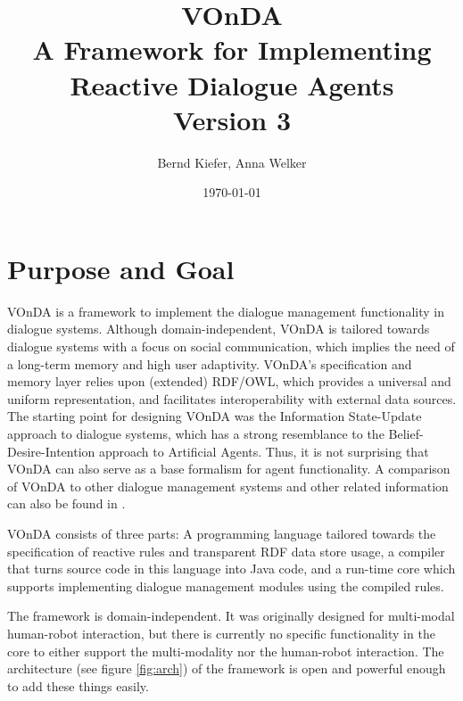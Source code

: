 \documentclass[a4paper]{report}
\newcommand{\vonda}{VOnDA\xspace}
\begin{document}
\title{\vonda\\\Large A Framework for Implementing Reactive Dialogue
  Agents\\Version 3}

\author{Bernd Kiefer, Anna Welker}
\date{\today}

\maketitle

\tableofcontents

\chapter{Purpose and Goal}

\vonda is a framework to implement the dialogue management functionality in
dialogue systems. Although domain-independent, \vonda is tailored towards
dialogue systems with a focus on social communication, which implies the need
of a long-term memory and high user adaptivity. \vonda's specification and
memory layer relies upon (extended) RDF/OWL, which provides a universal and
uniform representation, and facilitates interoperability with external data
sources. The starting point for designing \vonda was the Information
State-Update approach to dialogue systems, which has a strong resemblance to
the Belief-Desire-Intention approach to Artificial Agents. Thus, it is not
surprising that \vonda can also serve as a base formalism for agent
functionality. A comparison of \vonda to other dialogue management systems and
other related information can also be found in \cite{kieferetal_vonda_2019}.

\vonda consists of three parts: A programming language tailored towards the
specification of reactive rules and transparent RDF data store usage, a
compiler that turns source code in this language into Java code, and a run-time
core which supports implementing dialogue management modules using the compiled
rules.

The framework is domain-independent. It was originally designed for multi-modal
human-robot interaction, but there is currently no specific functionality in
the core to either support the multi-modality nor the human-robot
interaction. The architecture (see figure \ref{fig:arch}) of the framework is
open and powerful enough to add these things easily.

\end{document}
